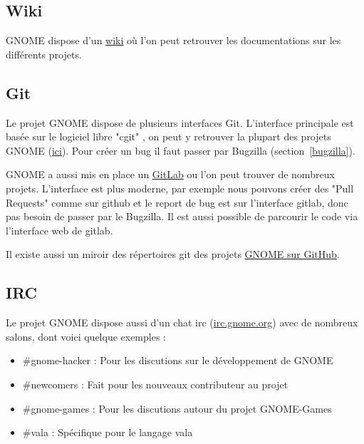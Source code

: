 \documentclass[12pt]{report}
\begin{document}

\subsection{Wiki}
\label{wiki}
GNOME dispose d'un \href{https://wiki.gnome.org/}{wiki} où l'on peut retrouver 
les documentations sur les différents projets.

\subsection{Git}
\label{git}

\label{cgit}
Le projet GNOME dispose de plusieurs interfaces Git. L'interface 
principale est basée sur le logiciel libre "cgit"
, on peut y retrouver la plupart des projets GNOME 
(\href{https://git.gnome.org/}{ici}). Pour créer un bug il faut passer par Bugzilla
(section~\ref{bugzilla}).

\label{gitlab}
GNOME a aussi mis en place un \href{https://gitlab.gnome.org/GNOME}{GitLab} 
ou l'on peut trouver de nombreux projets. L'interface est plus moderne,
par exemple nous pouvons créer des "Pull Requests" comme sur github
et le report de bug est sur l'interface gitlab, donc pas besoin de passer
par le Bugzilla. Il est aussi possible de parcourir le code via l'interface
web de gitlab.

\label{github}
Il existe aussi un miroir des répertoires git des projets 
\href{https://github.com/GNOME}{GNOME sur GitHub}.

\subsection{IRC}
Le projet GNOME dispose aussi d'un chat irc (\href{irc.gnome.org}{irc.gnome.org})
avec de nombreux salons, dont voici quelque exemples :
\begin{itemize}
\item \#gnome-hacker : Pour les discutions sur le développement de GNOME
\item \#newcomers : Fait pour les nouveaux contributeur au projet
\item \#gnome-games : Pour les discutions autour du projet GNOME-Games
\item \#vala : Spécifique pour le langage vala
\end{itemize}
\end{document}
